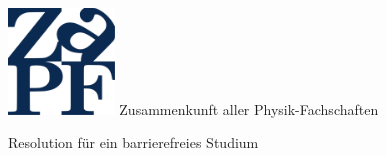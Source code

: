 \documentclass[DIV=calc]{scrartcl}
\begin{document}
\hspace{0.87\textwidth}
\begin{minipage}{120pt}
	\vspace{-1.8cm}
	\includegraphics[width=80pt]{../logo.pdf}
	\centering
	\small Zusammenkunft aller Physik-Fachschaften
\end{minipage}

\begin{center}
  \huge{Resolution für ein barrierefreies Studium}\vspace{.25\baselineskip}\\
  \normalsize
\end{center}
\vspace{1cm}




\end{document}
